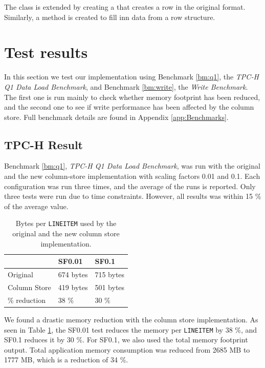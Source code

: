 The class is extended by creating a  that creates a row in the original format. Similarly, a method  is created to fill inn data from a row structure.

\section{Test results}
\label{sec:Test results}
In this section we test our implementation using Benchmark \ref{bm:q1}, the \textit{TPC-H Q1 Data Load Benchmark}, and Benchmark \ref{bm:write}, the \textit{Write Benchmark}. The first one is run mainly to check whether memory footprint has been reduced, and the second one to see if write performance has been affected by the column store. Full benchmark details are found in Appendix \ref{app:Benchmarks}.

\subsection{TPC-H Result}
\label{sub:TPC-H Result}
Benchmark \ref{bm:q1}, \textit{TPC-H Q1 Data Load Benchmark}, was run with the original and the new column-store implementation with scaling factors 0.01 and 0.1. Each configuration was run three times, and the average of the runs is reported. Only three tests were run due to time constraints. However, all results was within 15 \% of the average value.

\begin{table}
    \centering
    \begin{tabularx}{0.75\textwidth}{X | X X}
        & SF0.01 & SF0.1 \\ 
        \hline
        \hline
        Original & 674 bytes & 715 bytes \\
        Column Store & 419 bytes & 501 bytes \\
        \% reduction & 38 \% & 30 \% \\
    \end{tabularx}
    \caption{Bytes per \texttt{LINEITEM} used by the original and the new column store implementation.} 
    \label{tab:non-blackbox-bpl}
\end{table}
We found a drastic memory reduction with the column store implementation. As seen in Table \ref{tab:non-blackbox-bpl}, the SF0.01 test reduces the memory per \texttt{LINEITEM} by 38 \%, and SF0.1 reduces it by 30 \%. For SF0.1, we also used the total memory footprint output. Total application memory consumption was reduced from 2685 MB to 1777 MB, which is a reduction of 34 \%.

